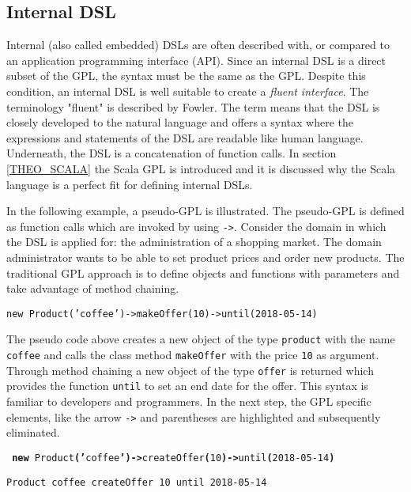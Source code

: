 \subsection{Internal DSL}
\label{THEO_DSL_INTERN}
Internal (also called embedded) DSLs are often described with, or compared to an application programming interface (API).\cite{Mernik2005, Ghosh2010, Riti2018} Since an internal DSL is a direct subset of the GPL, the syntax must be the same as the GPL. Despite this condition, an internal DSL is well suitable to create a \textit{fluent interface}. The terminology "fluent" is described by Fowler.\cite{Fowler2010} The term means that the DSL is closely developed to the natural language and offers a syntax where the expressions and statements of the DSL are readable like human language. Underneath, the DSL is a concatenation of function calls. In section \ref{THEO_SCALA} the Scala GPL is introduced and it is discussed why the Scala language is a perfect fit for defining internal DSLs.

In the following example, a pseudo-GPL is illustrated. The pseudo-GPL is defined as function calls which are invoked by using \texttt{->}. Consider the domain in which the DSL is applied for: the administration of a shopping market. The domain administrator wants to be able to set product prices and order new products. The traditional GPL approach is to define objects and functions with parameters and take advantage of method chaining.

\begin{center}
\texttt{new Product('coffee')->makeOffer(10)->until(2018-05-14)}
\end{center}

The pseudo code above creates a new object of the type \texttt{product} with the name \texttt{coffee} and calls the class method \texttt{makeOffer} with the price \texttt{10} as argument. Through method chaining a new object of the type \texttt{offer} is returned which provides the function \texttt{until} to set an end date for the offer. This syntax is familiar to developers and programmers. In the next step, the GPL specific elements, like the arrow \texttt{->} and parentheses are highlighted and subsequently eliminated.

\begin{center}
\texttt{ \textbf{new} Product\textbf{('}coffee\textbf{')->}createOffer\textbf{(}10\textbf{)->}until\textbf{(}2018-05-14\textbf{)}}
\end{center}

\begin{center}
\texttt{Product coffee createOffer 10 until 2018-05-14}
\end{center}


